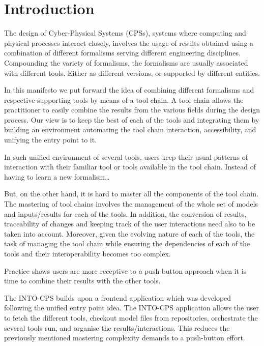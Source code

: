 
\section{Introduction}\label{sec:intro}


The design of Cyber-Physical Systems (CPSs), systems where computing and
physical processes interact closely, involves the usage of results obtained
using a combination of different formalisms serving different engineering
disciplines. Compounding the variety of formalisms, the formalisms are usually
associated with different tools. Either as different versions, or supported by 
different entities.

In this manifesto we put forward the idea of combining different formalisms and
respective supporting tools by means of a tool chain. A tool chain allows the
practitioner to easily combine the results from the various fields during the
design process.  Our view is to keep the best of each of the tools and
integrating them by building an environment automating the tool chain
interaction, accessibility, and unifying the entry point to it. 

In such unified environment of several tools, users keep their usual patterns
of interaction with their familiar tool or tools available in the tool chain.
Instead of having to learn a new formalism\ldots


But, on the other hand, it is hard to master all the components of the tool
chain.  The mastering of tool chains involves the management of the whole set
of models and inputs/results for each of the tools. In addition, the conversion
of results, traceability of changes and keeping track of the user interactions
need also to be taken into account.  Moreover, given the evolving nature of
each of the tools, the task of managing the tool chain while ensuring the
dependencies of each of the tools and their interoperability becomes too
complex. 

Practice shows users are more receptive to a  push-button approach when it is
time to combine their results with the other tools.  

The INTO-CPS builds upon a frontend application which was developed following the
unified entry point idea.  The INTO-CPS application allows the user to fetch
the different tools, checkout model files from repositories, orchestrate the
several tools run, and organise the results/interactions.  This reduces the
previously mentioned mastering complexity demands to a push-button effort.
 


